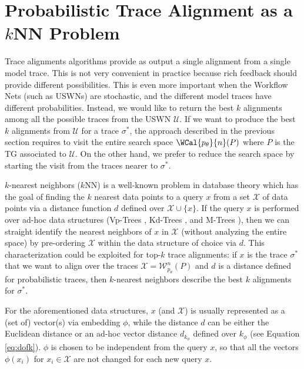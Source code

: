 
\section{Probabilistic Trace Alignment as a $k$NN Problem}\label{sec:topk}
Trace alignments algorithms provide as output a single alignment from a single model trace. This is not very convenient in practice because rich feedback should provide different possibilities. This is even more important when the Workflow Nets (such as USWNs) are stochastic, and the different model traces have different probabilities. {Instead, we would like to return the best $k$ alignments among all the possible \unravelled traces from the USWN $\mathcal{U}$. If we want to produce the best $k$ alignments from $\mathcal{U}$ for a trace $\sigma^*$, the approach described in the previous section requires to visit the entire search space $\WCal{p_\theta}{n}(P)$ where $P$ is the TG associated to $\mathcal{U}$. On the other hand, we prefer to reduce the search space by starting the visit from the traces nearer to $\sigma^*$.}



$k$-nearest neighbors ($k$NN) is a well-known problem in database theory \cite{Altman} which has the goal of finding the $k$ nearest data points to a query $x$ from a set $\mathcal{X}$ of data points via a distance function $d$ defined over $\mathcal{X}\cup\{x\}$. {If the query  $x$ is performed over ad-hoc data structures (Vp-Trees \cite{Fu2000}, Kd-Trees \cite{Maneewongvatana99}, and M-Trees \cite{Ciaccia}), then we can straight identify the nearest neighbors of $x$ in $\mathcal{X}$ (without analyzing the entire space) by pre-ordering $\mathcal{X}$ within the data structure of choice via $d$. This characterization could be exploited for top-$k$ trace alignments: if $x$ is the trace $\sigma^*$ that we want to align over the \unravelled traces $\mathcal{X}=\mathcal{W}^n_{p_\theta}(P)$ and $d$ is a distance defined for probabilistic traces, then $k$-nearest neighbors describe the best $k$ alignments for $\sigma^*$.}
	
{For the aforementioned data structures, $x$ (and $\mathcal{X}$) is usually represented as a (set of) vector(s) via embedding  $\phi$, while the distance $d$ can be either the Euclidean distance or an ad-hoc vector distance $d_{k_\phi}$ defined over $k_\phi$ (see Equation \ref{eq:dofk}). $\phi$ is chosen to be independent from the query $x$, so that all the vectors $\phi(x_i)$ for $x_i\in\mathcal{X}$ are not changed for each new query $x$.}

